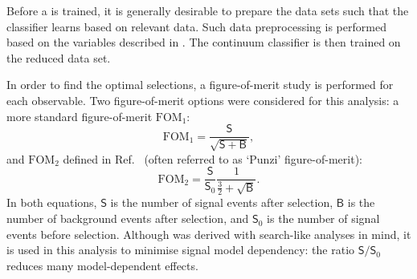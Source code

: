 Before a \BDT is trained, it is generally desirable to prepare the data sets such that the classifier 
learns based on relevant data.
Such data preprocessing is performed based on the variables described in .
The continuum classifier is then trained on the reduced data set.

In order to find the optimal selections, a figure-of-merit study is performed for each observable.
Two figure-of-merit options were considered for this analysis: a more standard figure-of-merit $\mathrm{FOM}_1$:
\begin{equation}\label{eq:soversqrtsplusb}
    \mathrm{FOM}_1 = \frac{\mathsf{S}}{\sqrt{\mathsf{S}+\mathsf{B}}},
\end{equation}
and $\mathrm{FOM}_2$ defined in Ref.~\cite{Punzi:2003bu} (often referred to as `Punzi' figure-of-merit):
\begin{equation}\label{eq:punzi_fom}
    \mathrm{FOM}_2 = \frac{\mathsf{S}}{\mathsf{S}_0} \frac{1}{\frac{3}{2}+\sqrt{\mathsf{B}}}.
\end{equation}
In both equations, $\mathsf{S}$ is the number of signal events after selection, 
$\mathsf{B}$ is the number of background events after selection, 
and $\mathsf{S}_0$ is the number of signal events before selection.
Although  was derived with search-like analyses in mind, 
it is used in this analysis to minimise signal model dependency: the ratio $\mathsf{S}/\mathsf{S}_0$ reduces many model-dependent effects.

